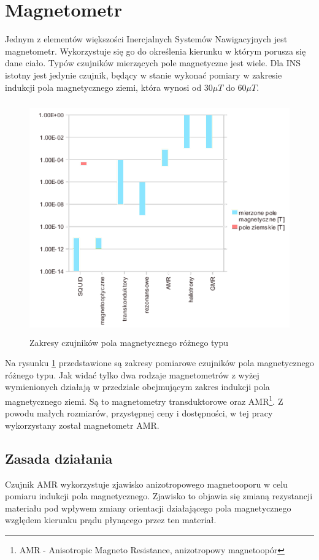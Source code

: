 \section{Magnetometr}
Jednym z elementów większości Inercjalnych Systemów Nawigacyjnych jest
magnetometr. Wykorzystuje się go do określenia kierunku w którym porusza się dane
ciało. Typów czujników mierzących pole magnetyczne jest wiele. Dla INS istotny jest jedynie czujnik, będący w stanie wykonać pomiary w zakresie indukcji pola magnetycznego ziemi, która wynosi od $30\mu T$ do $60\mu T$.
\\

\begin{figure}[!ht]
 \centering
 \includegraphics[height=100mm]{../images/ch04/magnetic_sens_types.png}
 \caption{Zakresy czujników pola magnetycznego różnego typu \cite{WstepnyProjektModuluIMU}}
 \label{fig:WykresMagnet}
\end{figure}

Na rysunku \ref{fig:WykresMagnet} przedstawione są zakresy pomiarowe czujników
pola magnetycznego różnego typu. Jak widać tylko dwa rodzaje magnetometrów z
wyżej wymienionych działają w przedziale obejmującym zakres indukcji pola
magnetycznego ziemi. Są to magnetometry transduktorowe oraz AMR\footnote{AMR - Anisotropic Magneto Resistance, anizotropowy magnetoopór}. Z powodu małych rozmiarów, przystępnej ceny i dostępności, w tej pracy wykorzystany został magnetometr AMR.
\\

\subsection{Zasada działania}
Czujnik AMR wykorzystuje zjawisko anizotropowego magnetooporu w celu pomiaru indukcji pola magnetycznego. Zjawisko to objawia się zmianą rezystancji materiału pod wpływem zmiany orientacji działającego pola magnetycznego względem kierunku prądu płynącego przez ten materiał.
\\

